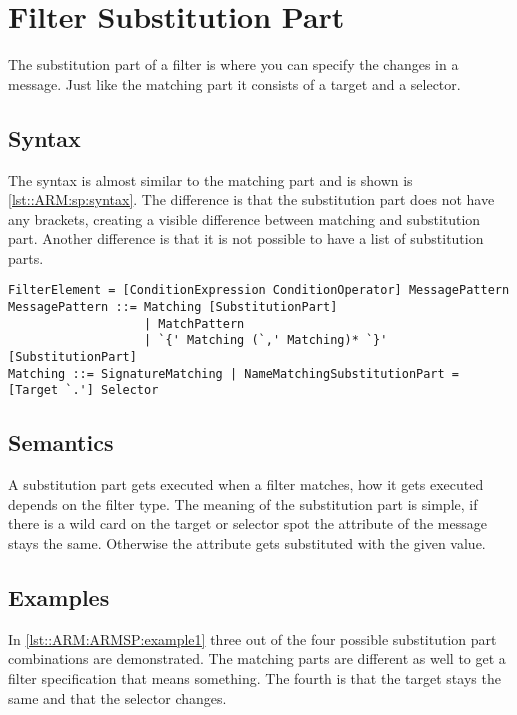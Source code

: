 \chapter{Filter Substitution Part}
The substitution part of a filter is where you can specify the changes in a message. Just like the
matching part it consists of a target and a selector.

\section*{Syntax}
The syntax is almost similar to the matching part and is shown is \autoref{lst::ARM:sp:syntax}. The difference is
that the substitution part does not have any brackets, creating a visible difference between matching and substitution part. Another difference is that it is not possible to have a list of substitution parts.

\begin{lstlisting}[caption={Filter substitution part syntax},label=lst::ARM:sp:syntax,style = listing,language = ebnf,float=tpb]
FilterElement = [ConditionExpression ConditionOperator] MessagePattern
MessagePattern ::= Matching [SubstitutionPart]
                   | MatchPattern
                   | `{' Matching (`,' Matching)* `}' [SubstitutionPart] 
Matching ::= SignatureMatching | NameMatchingSubstitutionPart = [Target `.'] Selector
\end{lstlisting}

\section*{Semantics}
A substitution part gets executed when a filter matches, how it gets executed depends on the filter type.
The meaning of the substitution part is simple, if there is a wild card on the target or selector spot the attribute of the message
stays the same. Otherwise the attribute gets substituted with the given value.

\section*{Examples}
In \autoref{lst::ARM:ARMSP:example1} three out of the four possible substitution part combinations are demonstrated. The matching parts are different as well to get a filter specification that means something.
The fourth is that the target stays the same and that the selector changes.

